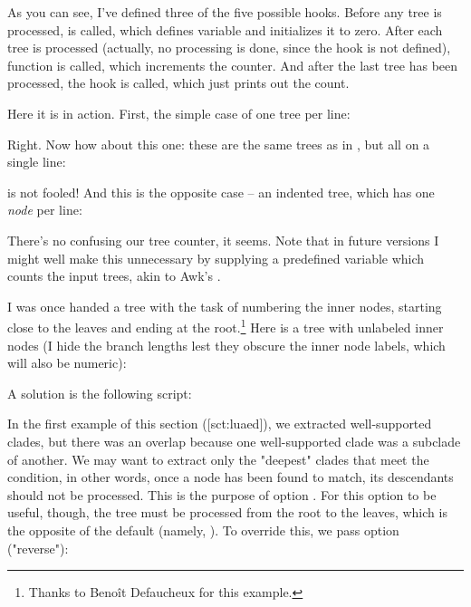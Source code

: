 
As you can see, I've defined three of the five possible hooks. Before any tree
is processed,  is called, which defines variable
 and initializes it to zero. After each tree is processed
(actually, no processing is done, since the  hook is not defined),
function  is called, which increments the counter. And after
the last tree has been processed, the  hook is called, which
just prints out the count.

Here it is in action. First, the simple case of one tree per line:



Right. Now how about this one: these are the same trees as in
, but all on a single line:



\luaed{} is not fooled! And this is the opposite case -- an indented tree, which has one {\em node} per line:



There's no confusing our tree counter, it seems. Note that in future versions I
might well make this unnecessary by supplying a predefined variable which counts
the input trees, akin to Awk's .


I was once handed a tree with the task of numbering the inner nodes, starting
close to the leaves and ending at the root.\footnote{Thanks to Beno\^{i}t
Defaucheux for this example.} Here is a tree with unlabeled inner nodes (I hide
the branch lengths lest they obscure the inner node labels, which will also be
numeric):


A solution is the following \luaed{} script:




In the first example of this section (\in{}[sct:luaed]), we extracted
well-supported clades, but there was an overlap because one well-supported clade
was a subclade of another. We may want to extract only the "deepest" clades that
meet the condition, in other words, once a node has been found to match, its
descendants should not be processed. This is the purpose of option .
For this option to be useful, though, the tree must be processed from the root
to the leaves, which is the opposite of the default (namely, \no). To override
this, we pass option  ("reverse"):

